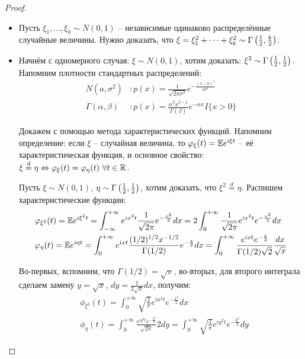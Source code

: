 \begin{proof}~
    \begin{itemize}
        \item Пусть $\xi_1, \dots, \xi_k \sim N(0, 1)$ -- независимые одинаково распределённые случайные величины. Нужно доказать, что $\xi = \xi_1^2 + \dots + \xi_k^2 \sim \Gamma\left(\frac{1}{2}, \frac{k}{2}\right)$.

        \item Начнём с одномерного случая: $\xi \sim N(0, 1)$, хотим доказать: $\xi^2 \sim \Gamma\left(\frac{1}{2}, \frac{1}{2}\right).$ Напомним плотности стандартных распределений:
        \begin{align*}
            N(a, \sigma^2) &\colon p(x) = \frac{1}{\sqrt{2 \pi \sigma^2}} e^{-\frac{(x-a)^2}{2 \sigma^2}}
            \\
            \Gamma(\alpha, \beta) &\colon p(x) = \frac{\alpha^\beta x^{\beta-1}}{\Gamma(\beta)} e^{-\alpha x} I\{x > 0\}
        \end{align*}

        Докажем с помощью метода характеристических функций. Напомним определение: если $\xi$ -- случайная величина, то $\varphi_\xi(t) = \mathbb{E} e^{i \xi t}$ -- её характеристическая функция, и основное свойство: $\xi \stackrel{d}{=} \eta \Leftrightarrow \varphi_\xi(t) = \varphi_\eta(t) \ \forall t \in \mathbb{R}$.

        Пусть $\xi \sim N(0, 1)$, $\eta \sim \Gamma\left(\frac{1}{2}, \frac{1}{2}\right)$, хотим доказать, что $\xi^2 \stackrel{d}{=} \eta$. Распишем характеристические функции:
        \begin{align*}
            & \varphi_{\xi^2}(t) = \mathbb{E} e^{i \xi^2 t} = \int_{-\infty}^{+\infty} e^{i x^2 t} \frac{1}{\sqrt{2 \pi}} e^{-\frac{x^2}{2}} dx = 2 \int_0^{+\infty} \frac{1}{\sqrt{2 \pi}} e^{i x^2 t} e^{-\frac{x^2}{2}} dx
            \\
            & \varphi_\eta(t) = \mathbb{E} e^{i \eta t} = \int_0^{+\infty} e^{ixt} \frac{(1/2)^{1/2} x^{-1/2}}{\Gamma(1/2)} e^{-\frac{x}{2}} dx = \int_0^{+\infty} \frac{e^{ixt} e^{-\frac{x}{2}}}{\Gamma(1/2) \sqrt{2}} \frac{dx}{\sqrt{x}}
        \end{align*}

        Во-первых, вспомним, что $\Gamma(1/2) = \sqrt{\pi}$, во-вторых, для второго интеграла сделаем замену $y = \sqrt{x}$, $dy = \frac{1}{2 \sqrt{x}} dx$, получим:
        \begin{align*}
            & \phi_{\xi^2}(t) = \int_0^{+\infty} \sqrt{\frac{2}{\pi}} e^{i x^2 t} e^{-\frac{x^2}{2}} dx
            \\
            & \phi_\eta(t) = \int_0^{+\infty} \frac{e^{iy^2t} e^{-\frac{y^2}{2}}}{\sqrt{2 \pi}} 2 dy = \int_0^{+\infty} \sqrt{\frac{2}{\pi}} e^{i y^2 t} e^{-\frac{y^2}{2}} dy
        \end{align*}


\end{itemize}
\end{proof}
